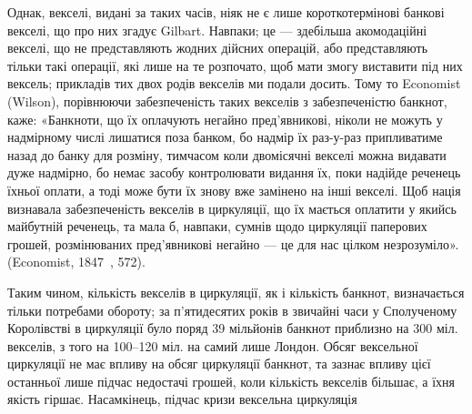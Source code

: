 Однак, векселі, видані за таких часів, ніяк не є лише короткотермінові
банкові векселі, що про них згадує Gilbart. Навпаки; це — здебільша акомодаційні
векселі, що не представляють жодних дійсних операцій, або представляють
тільки такі операції, які лише на те розпочато, щоб мати змогу виставити під них
вексель; прикладів тих двох родів векселів ми подали досить. Тому то Economist
(Wilson), порівнюючи забезпеченість таких векселів з забезпеченістю банкнот,
каже: «Банкноти, що їх оплачують негайно пред’явникові, ніколи не можуть у
надмірному числі лишатися поза банком, бо надмір їх раз-у-раз припливатиме
назад до банку для розміну, тимчасом коли двомісячні векселі можна видавати
дуже надмірно, бо немає засобу контролювати видання їх, поки надійде реченець
їхньої оплати, а тоді може бути їх знову вже замінено на інші векселі. Щоб
нація визнавала забезпеченість векселів в циркуляції, що їх мається оплатити
у якийсь майбутній реченець, та мала б, навпаки, сумнів щодо циркуляції
паперових грошей, розмінюваних пред’явникові негайно — це для нас цілком
незрозуміло». (Economist, 1847~, 572).

Таким чином, кількість векселів в циркуляції, як і кількість банкнот, визначається
тільки потребами обороту; за п’ятидесятих років в звичайні часи у
Сполученому Королівстві в циркуляції було поряд 39 мільйонів банкнот приблизно
на 300 міл. векселів, з того на 100--120 міл. на самий лише Лондон. Обсяг
вексельної циркуляції не має впливу на обсяг циркуляції банкнот, та зазнає
впливу цієї останньої лише підчас недостачі грошей, коли кількість векселів
більшає, а їхня якість гіршає. Насамкінець, підчас кризи вексельна циркуляція
\parbreak{}  %
